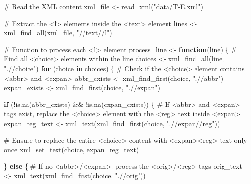 \documentclass[
  letterpaper,
  DIV=11,
  numbers=noendperiod]{scrreprt}
\newenvironment{Shaded}{\begin{snugshade}}{\end{snugshade}}
\newcommand{\CommentTok}[1]{\textcolor[rgb]{0.37,0.37,0.37}{#1}}
\newcommand{\ControlFlowTok}[1]{\textcolor[rgb]{0.00,0.23,0.31}{\textbf{#1}}}
\newcommand{\FunctionTok}[1]{\textcolor[rgb]{0.28,0.35,0.67}{#1}}
\newcommand{\NormalTok}[1]{\textcolor[rgb]{0.00,0.23,0.31}{#1}}
\newcommand{\OtherTok}[1]{\textcolor[rgb]{0.00,0.23,0.31}{#1}}
\newcommand{\SpecialCharTok}[1]{\textcolor[rgb]{0.37,0.37,0.37}{#1}}
\newcommand{\StringTok}[1]{\textcolor[rgb]{0.13,0.47,0.30}{#1}}
\begin{document}
\begin{Shaded}
\begin{Highlighting}[]
\CommentTok{\# Read the XML content}
\NormalTok{xml\_file }\OtherTok{\textless{}{-}} \FunctionTok{read\_xml}\NormalTok{(}\StringTok{"data/T{-}E.xml"}\NormalTok{)}

\CommentTok{\# Extract the \textless{}l\textgreater{} elements inside the \textless{}text\textgreater{} element}
\NormalTok{lines }\OtherTok{\textless{}{-}} \FunctionTok{xml\_find\_all}\NormalTok{(xml\_file, }\StringTok{"//text//l"}\NormalTok{)}

\CommentTok{\# Function to process each \textless{}l\textgreater{} element}
\NormalTok{process\_line }\OtherTok{\textless{}{-}} \ControlFlowTok{function}\NormalTok{(line) \{}
  \CommentTok{\# Find all \textless{}choice\textgreater{} elements within the line}
\NormalTok{  choices }\OtherTok{\textless{}{-}} \FunctionTok{xml\_find\_all}\NormalTok{(line, }\StringTok{".//choice"}\NormalTok{)}
  \ControlFlowTok{for}\NormalTok{ (choice }\ControlFlowTok{in}\NormalTok{ choices) \{}
    \CommentTok{\# Check if the \textless{}choice\textgreater{} element contains \textless{}abbr\textgreater{} and \textless{}expan\textgreater{}}
\NormalTok{    abbr\_exists }\OtherTok{\textless{}{-}} \FunctionTok{xml\_find\_first}\NormalTok{(choice, }\StringTok{".//abbr"}\NormalTok{)}
\NormalTok{    expan\_exists }\OtherTok{\textless{}{-}} \FunctionTok{xml\_find\_first}\NormalTok{(choice, }\StringTok{".//expan"}\NormalTok{)}
    
    \ControlFlowTok{if}\NormalTok{ (}\SpecialCharTok{!}\FunctionTok{is.na}\NormalTok{(abbr\_exists) }\SpecialCharTok{\&\&} \SpecialCharTok{!}\FunctionTok{is.na}\NormalTok{(expan\_exists)) \{}
      \CommentTok{\# If \textless{}abbr\textgreater{} and \textless{}expan\textgreater{} tags exist, replace the \textless{}choice\textgreater{} element with the \textless{}reg\textgreater{} text inside \textless{}expan\textgreater{}}
\NormalTok{      expan\_reg\_text }\OtherTok{\textless{}{-}} \FunctionTok{xml\_text}\NormalTok{(}\FunctionTok{xml\_find\_first}\NormalTok{(choice, }\StringTok{".//expan//reg"}\NormalTok{))}

      \CommentTok{\# Ensure to replace the entire \textless{}choice\textgreater{} content with \textless{}expan\textgreater{}\textless{}reg\textgreater{} text only once}
      \FunctionTok{xml\_set\_text}\NormalTok{(choice, expan\_reg\_text)}
      
\NormalTok{    \} }\ControlFlowTok{else}\NormalTok{ \{}
      \CommentTok{\# If no \textless{}abbr\textgreater{}/\textless{}expan\textgreater{}, process the \textless{}orig\textgreater{}/\textless{}reg\textgreater{} tags}
\NormalTok{      orig\_text }\OtherTok{\textless{}{-}} \FunctionTok{xml\_text}\NormalTok{(}\FunctionTok{xml\_find\_first}\NormalTok{(choice, }\StringTok{".//orig"}\NormalTok{))}
      

\end{Highlighting}
\end{Shaded}
\end{document}
